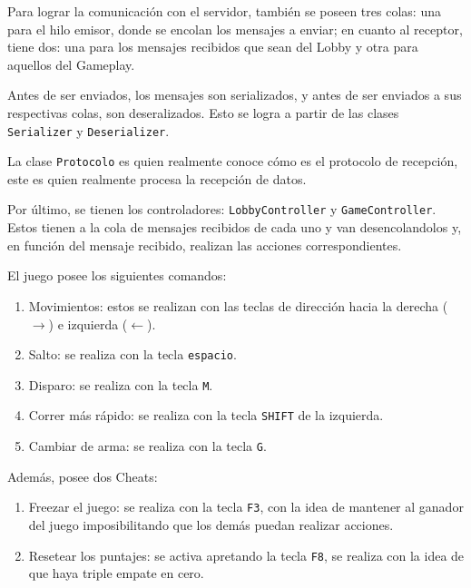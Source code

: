 \documentclass[titlepage,a4paper]{article}
\begin{document}
Para lograr la comunicación con el servidor, también se poseen tres colas: una para el hilo emisor, donde se encolan los mensajes a enviar; en cuanto al receptor, tiene dos: una para los mensajes recibidos que sean del Lobby y otra para aquellos del Gameplay. 

Antes de ser enviados, los mensajes son serializados, y antes de ser enviados a sus respectivas colas, son deseralizados. Esto se logra a partir de las clases \texttt{Serializer} y \texttt{Deserializer}.

La clase \texttt{Protocolo} es quien realmente conoce cómo es el protocolo de recepción, este es quien realmente procesa la recepción de datos. 

Por último, se tienen los controladores: \texttt{LobbyController} y \texttt{GameController}. Estos tienen a la cola de mensajes recibidos de cada uno y van desencolandolos y, en función del mensaje recibido, realizan las acciones correspondientes.

El juego posee los siguientes comandos:
\begin{enumerate}
  \item Movimientos: estos se realizan con las teclas de dirección hacia la derecha ($\rightarrow$) e izquierda ($\leftarrow$).
  \item Salto: se realiza con la tecla \texttt{espacio}.
  \item Disparo: se realiza con la tecla \texttt{M}.
  \item Correr más rápido: se realiza con la tecla \texttt{SHIFT} de la izquierda.
  \item Cambiar de arma: se realiza con la tecla \texttt{G}.
\end{enumerate}

Además, posee dos Cheats:
\begin{enumerate}
  \item Freezar el juego: se realiza con la tecla \texttt{F3}, con la idea de mantener al ganador del juego imposibilitando que los demás puedan realizar acciones.
  \item Resetear los puntajes: se activa apretando la tecla \texttt{F8}, se realiza con la idea de que haya triple empate en cero.
\end{enumerate}
\end{document}
